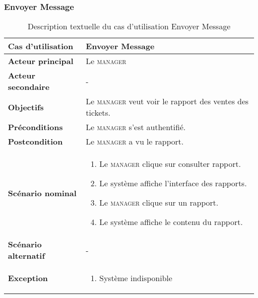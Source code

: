         \subsubsection[Envoyer Message]{Envoyer Message}
        \begin{longtable}{p{4cm} p{9cm}}
            \caption{Description textuelle du cas d’utilisation Envoyer Message}
            \label{table:usecaseConsulterRapportJ}
            \\\hline\hline
                \textbf{Cas d’utilisation} & \textbf{Envoyer Message}
            \\\hline\hline
                    \textbf{Acteur principal} & Le \textsc{manager}
                \\
                    \textbf{Acteur secondaire} & -
                \\
                    \textbf{Objectifs} & Le \textsc{manager} veut voir le rapport des ventes
                    des tickets.
                \\
                    \textbf{Préconditions} & Le \textsc{manager} s’est authentifié.
                \\
                    \textbf{Postcondition} & Le \textsc{manager} a vu le rapport.
                \\
                \textbf{Scénario nominal} &
                    \begin{enumerate}[leftmargin=*]
                        \item Le \textsc{manager} clique sur consulter rapport.
                        \item Le système affiche l’interface des rapports.
                        \item Le \textsc{manager} clique sur un rapport.
                        \item Le système affiche le contenu du rapport.
                    \end{enumerate}
                \\
                \textbf{Scénario alternatif} & -
                \\
                \textbf{Exception} &
                    \begin{enumerate}[leftmargin=*]
                        \item Système indisponible
                    \end{enumerate}
            \\\bottomrule
        \end{longtable}
\pagebreak
